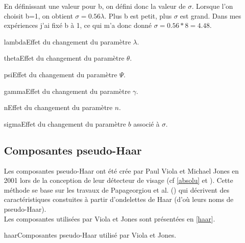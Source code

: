 \documentclass[overfullbox, poster]{polytech/polytech}
\begin{document}
En définissant une valeur pour b, on défini donc la valeur de $\sigma $. Lorsque l'on choisit b=1, on obtient $\sigma =0.56\lambda $. Plus b est petit, plus $\sigma $ est grand. Dans mes expériences j'ai fixé b à 1, ce qui m'a donc donné $\sigma = 0.56 * 8 = 4.48$.
\newpage
\begin{Figure}{lambda}{Effet du changement du paramètre $\lambda $}.
\end{Figure}
\begin{Figure}{theta}{Effet du changement du paramètre $\theta $}.
\end{Figure}
\newpage
\begin{Figure}{psi}{Effet du changement du paramètre $\Psi $}.
\end{Figure}
\begin{Figure}{gamma}{Effet du changement du paramètre $\gamma $}.
\end{Figure}
\newpage
\begin{Figure}{n}{Effet du changement du paramètre $n $}.
\end{Figure}
\begin{Figure}{sigma}{Effet du changement du paramètre $b $ associé à $\sigma $}.
\end{Figure}

\subsection{Composantes pseudo-Haar}
Les composantes pseudo-Haar ont été crée par Paul Viola et Michael Jones en 2001 lors de la conception de leur détecteur de visage (cf \autoref{absolu} et \cite{violajones}). Cette méthode se base sur les travaux de Papageorgiou et al. (\cite{papa}) qui décrivent des caractéristiques constuites à partir d'ondelettes de Haar (d'où leurs noms de pseudo-Haar).\\
Les composantes utilisées par Viola et Jones sont présentées en \autoref{haar}.

\begin{Figure}{haar}{Composantes pseudo-Haar utilisé par Viola et Jones}.
\end{Figure}
\end{document}
